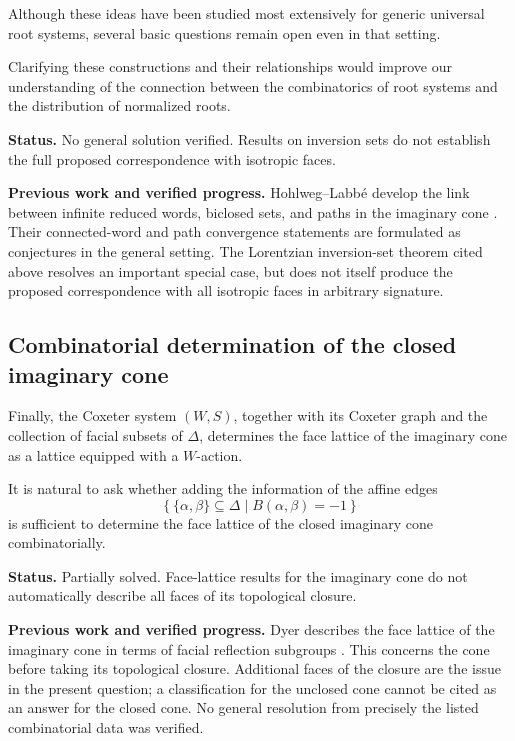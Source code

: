 \documentclass[11pt,reqno]{amsart}
\theoremstyle{plain}
\theoremstyle{definition}
\theoremstyle{remark}
\numberwithin{equation}{section}
\begin{document}
Although these ideas have been studied most extensively
for generic universal root systems, several basic
questions remain open even in that setting.

Clarifying these constructions and their relationships
would improve our understanding of the connection
between the combinatorics of root systems and the
distribution of normalized roots.


\par\medskip
\noindent\textbf{Status.} No general solution verified. Results on inversion sets do not establish the full proposed correspondence with isotropic faces.

\par\medskip
\noindent\textbf{Previous work and verified progress.}
Hohlweg--Labb\'e develop the link between infinite reduced words,
biclosed sets, and paths in the imaginary cone
\cite[Sections~4.2--4.3]{HL2016}. Their connected-word and path convergence
statements are formulated as conjectures in the general setting.
The Lorentzian inversion-set theorem cited above resolves an important
special case, but does not itself produce the proposed correspondence
with all isotropic faces in arbitrary signature.

\subsection{Combinatorial determination of the closed imaginary cone}

Finally, the Coxeter system $(W,S)$, together with
its Coxeter graph and the collection of facial subsets
of $\Delta$, determines the face lattice of the
imaginary cone as a lattice equipped with a $W$-action.

It is natural to ask whether adding the information
of the affine edges
\[
\left\{
\{\alpha,\beta\}\subseteq\Delta
\mid B(\alpha,\beta)=-1
\right\}
\]
is sufficient to determine the face lattice of the
closed imaginary cone combinatorially.


\par\medskip
\noindent\textbf{Status.} Partially solved. Face-lattice results for the imaginary cone do not automatically describe all faces of its topological closure.

\par\medskip
\noindent\textbf{Previous work and verified progress.}
Dyer describes the face lattice of the imaginary cone in terms of
facial reflection subgroups \cite{Dyer2019}. This concerns the cone
before taking its topological closure. Additional faces of the closure
are the issue in the present question; a classification for the unclosed
cone cannot be cited as an answer for the closed cone. No general
resolution from precisely the listed combinatorial data was verified.
\end{document}

